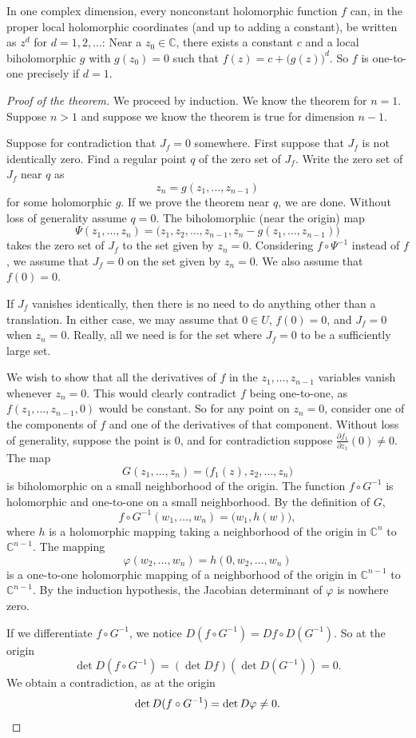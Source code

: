 \documentclass[UTF8,11pt]{ctexart}
\theoremstyle{definition}
\newcommand{\C}{\mathbb C}
\begin{document}
In one complex dimension, every nonconstant holomorphic function $f$ can, in the proper local holomorphic coordinates (and up to adding a constant), be written as $z^d$ for $d=1,2,\ldots$: Near a $z_0\in\C$, there exists a constant $c$ and a local biholomorphic $g$ with $g(z_0)=0$ such that $f(z)=c+\bigl(g(z)\bigr)^d$. So $f$ is one-to-one precisely if $d=1$.
\begin{proof}[Proof of the theorem]
We proceed by induction. We know the theorem for $n=1$. Suppose $n>1$ and suppose we know the theorem is true for dimension $n-1$.

Suppose for contradiction that $J_f=0$ somewhere. First suppose that $J_f$ is not identically zero. Find a regular point $q$ of the zero set of $J_f$. Write the zero set of $J_f$ near $q$ as
\[z_n=g(z_1,\ldots,z_{n-1})\]
for some holomorphic $g$. If we prove the theorem near $q$, we are done. Without loss of generality assume $q=0$. The biholomorphic (near the origin) map
\[\Psi(z_1,\ldots,z_n)=\bigl(z_1,z_2,\ldots,z_{n-1},z_n-g(z_1,\ldots,z_{n-1})\bigr)\]
takes the zero set of $J_f$ to the set given by $z_n=0$. Considering $f\circ\Psi^{-1}$ instead of $f$, we assume that $J_f=0$ on the set given by $z_n=0$. We also assume that $f(0)=0$.

If $J_f$ vanishes identically, then there is no need to do anything other than a translation. In either case, we may assume that $0\in U$, $f(0)=0$, and $J_f=0$ when $z_n=0$. Really, all we need is for the set where $J_f=0$ to be a sufficiently large set.

We wish to show that all the derivatives of $f$ in the $z_1,\ldots,z_{n-1}$ variables vanish whenever $z_n=0$. This would clearly contradict $f$ being one-to-one, as $f(z_1,\ldots,z_{n-1},0)$ would be constant. So for any point on $z_n=0$, consider one of the components of $f$ and one of the derivatives of that component. Without loss of generality, suppose the point is $0$, and for contradiction suppose $\frac{\partial f_1}{\partial z_1}(0)\ne0$. The map
\[G(z_1,\ldots,z_n)=\bigl(f_1(z),z_2,\ldots,z_n\bigr)\]
is biholomorphic on a small neighborhood of the origin. The function $f\circ G^{-1}$ is holomorphic and one-to-one on a small neighborhood. By the definition of $G$,
\[f\circ G^{-1}(w_1,\ldots,w_n)=\bigl(w_1,h(w)\bigr),\]
where $h$ is a holomorphic mapping taking a neighborhood of the origin in $\C^n$ to $\C^{n-1}$. The mapping
\[\varphi(w_2,\ldots,w_n)=h(0,w_2,\ldots,w_n)\]
is a one-to-one holomorphic mapping of a neighborhood of the origin in $\C^{n-1}$ to $\C^{n-1}$. By the induction hypothesis, the Jacobian determinant of $\varphi$ is nowhere zero.

If we differentiate $f\circ G^{-1}$, we notice $D(f\circ G^{-1})=Df\circ D(G^{-1})$. So at the origin
\[\det D(f\circ G^{-1})=(\det Df)(\det D(G^{-1}))=0.\]
We obtain a contradiction, as at the origin
\[\det D(f\circ G^{-1})=\det D\varphi\ne0.\qedhere\]
\end{proof}
\end{document}
